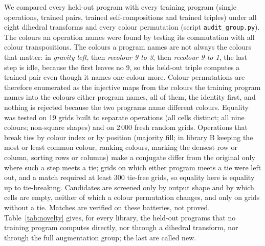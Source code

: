 \documentclass[11pt]{article}
\begin{document}
We compared every held-out program with every training program (single operations, trained pairs, trained
self-compositions and trained triples) under all eight dihedral transforms and every colour permutation (script
\texttt{audit\_group.py}). The colours an operation names were found by testing its commutation with all colour
transpositions. The colours a program names are not always the colours that matter: in \emph{gravity left}, then
\emph{recolour 9 to 3}, then \emph{recolour 9 to 1}, the last step is idle, because the first leaves no 9, so this
held-out triple computes a trained pair even though it names one colour more. Colour permutations are therefore
enumerated as the injective maps from the colours the training program names into the colours either program
names, all of them, the identity first, and nothing is rejected because the two programs name different colours. Equality was
tested on 19 grids built to separate operations (all cells distinct; all nine colours; non-square shapes) and on
2\,000 fresh random grids. Operations that break ties by colour index or by position (majority fill; in library B
keeping the most or least common colour, ranking colours, marking the densest row or column, sorting rows or
columns) make a conjugate differ from the original only where such a step meets a tie; grids on which either
program meets a tie were left out, and a match required at least 300 tie-free grids, so equality here is equality
up to tie-breaking. Candidates are screened only by output shape and by which cells are empty, neither of which a
colour permutation changes, and only on grids without a tie. Matches are verified on these batteries, not proved. Table~\ref{tab:novelty} gives, for every
library, the held-out programs that no training program computes directly, nor through a dihedral transform, nor
through the full augmentation group; the last are called new.

\begin{table}[h]\centering\small\resizebox{\textwidth}{!}{}
\caption{Held-out programs not computed by any training program directly (not direct), nor through a dihedral
transform (not dihedral), nor through any dihedral transform combined with a colour permutation (new), per
library and split. Training programs include trained triples.}\label{tab:novelty}
\end{table}
\end{document}
